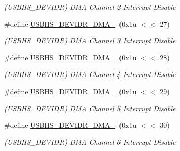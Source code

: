 \begin{DoxyCompactItemize}
\begin{DoxyCompactList}\small\item\em (U\+S\+B\+H\+S\+\_\+\+D\+E\+V\+I\+DR) D\+MA Channel 2 Interrupt Disable \end{DoxyCompactList}\item 
\mbox{\label{group__SAMV71__USBHS_gad447f7973e83a2cf9f5e58e5192e7472}} 
\#define \mbox{\hyperlink{group__SAMV71__USBHS_gad447f7973e83a2cf9f5e58e5192e7472}{U\+S\+B\+H\+S\+\_\+\+D\+E\+V\+I\+D\+R\+\_\+\+D\+M\+A\+\_}}~(0x1u $<$$<$ 27)
\begin{DoxyCompactList}\small\item\em (U\+S\+B\+H\+S\+\_\+\+D\+E\+V\+I\+DR) D\+MA Channel 3 Interrupt Disable \end{DoxyCompactList}\item 
\mbox{\label{group__SAMV71__USBHS_gaaf3c1efa98e84b78bb7d7d0191936406}} 
\#define \mbox{\hyperlink{group__SAMV71__USBHS_gaaf3c1efa98e84b78bb7d7d0191936406}{U\+S\+B\+H\+S\+\_\+\+D\+E\+V\+I\+D\+R\+\_\+\+D\+M\+A\+\_}}~(0x1u $<$$<$ 28)
\begin{DoxyCompactList}\small\item\em (U\+S\+B\+H\+S\+\_\+\+D\+E\+V\+I\+DR) D\+MA Channel 4 Interrupt Disable \end{DoxyCompactList}\item 
\mbox{\label{group__SAMV71__USBHS_ga4cb9a975fc02e8ff3ebce0943b7d99ce}} 
\#define \mbox{\hyperlink{group__SAMV71__USBHS_ga4cb9a975fc02e8ff3ebce0943b7d99ce}{U\+S\+B\+H\+S\+\_\+\+D\+E\+V\+I\+D\+R\+\_\+\+D\+M\+A\+\_}}~(0x1u $<$$<$ 29)
\begin{DoxyCompactList}\small\item\em (U\+S\+B\+H\+S\+\_\+\+D\+E\+V\+I\+DR) D\+MA Channel 5 Interrupt Disable \end{DoxyCompactList}\item 
\mbox{\label{group__SAMV71__USBHS_gae7c9b7dc9158c83a2f29c2da518cd04d}} 
\#define \mbox{\hyperlink{group__SAMV71__USBHS_gae7c9b7dc9158c83a2f29c2da518cd04d}{U\+S\+B\+H\+S\+\_\+\+D\+E\+V\+I\+D\+R\+\_\+\+D\+M\+A\+\_}}~(0x1u $<$$<$ 30)
\begin{DoxyCompactList}\small\item\em (U\+S\+B\+H\+S\+\_\+\+D\+E\+V\+I\+DR) D\+MA Channel 6 Interrupt Disable \end{DoxyCompactList}\item 

\end{DoxyCompactItemize}
